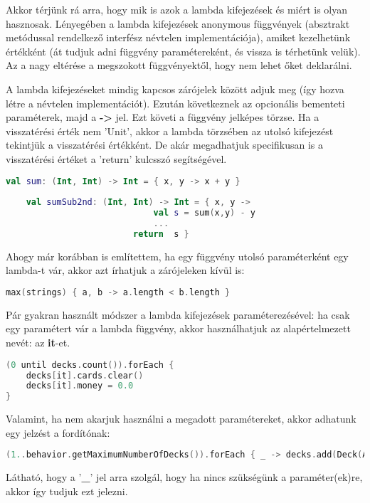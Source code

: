 Akkor térjünk rá arra, hogy mik is azok a lambda kifejezések és miért is olyan hasznosak. Lényegében a lambda kifejezések anonymous függvények (absztrakt metódussal rendelkező interfész névtelen implementációja), amiket kezelhetünk értékként (át tudjuk adni függvény paramétereként, és vissza is térhetünk velük). Az a nagy eltérése a megszokott függvényektől, hogy nem lehet őket deklarálni. 

A lambda kifejezéseket mindig kapcsos zárójelek között adjuk meg (így hozva létre a névtelen implementációt). Ezután következnek az opcionális bementeti paraméterek, majd  a \textbf{->} jel. Ezt követi a függvény jelképes törzse. Ha a visszatérési érték nem 'Unit', akkor a lambda törzsében az utolsó kifejezést tekintjük a visszatérési értékként. De akár megadhatjuk specifikusan is a visszatérési értéket a 'return' kulcsszó segítségével.
\scriptsize
\begin{lstlisting}[language = Kotlin]
	val sum: (Int, Int) -> Int = { x, y -> x + y }
	
	val sumSub2nd: (Int, Int) -> Int = { x, y -> 
				             val s = sum(x,y) - y
				             ...
					     return  s }
\end{lstlisting}
\normalsize
Ahogy már korábban is említettem, ha egy függvény utolsó paraméterként egy lambda-t vár, akkor azt írhatjuk a zárójeleken kívül is:
\scriptsize
\begin{lstlisting}[language = Kotlin]
	max(strings) { a, b -> a.length < b.length }
\end{lstlisting}
\normalsize
Pár gyakran használt módszer a lambda kifejezések paraméterezésével: ha csak egy paramétert vár a lambda függvény, akkor használhatjuk az alapértelmezett nevét: az \textbf{it}-et.
\scriptsize
\begin{lstlisting}[language = Kotlin]
(0 until decks.count()).forEach {
	decks[it].cards.clear()
	decks[it].money = 0.0
}
\end{lstlisting}
\normalsize
Valamint, ha nem akarjuk használni a megadott paramétereket, akkor adhatunk egy jelzést a fordítónak:
\scriptsize
\begin{lstlisting}[language = Kotlin]
  (1..behavior.getMaximumNumberOfDecks()).forEach { _ -> decks.add(Deck(ArrayList(), 0.0)) }
\end{lstlisting}
\normalsize
Látható, hogy a '\textbf{\_}' jel arra szolgál, hogy ha nincs szükségünk a paraméter(ek)re, akkor így tudjuk ezt jelezni.


